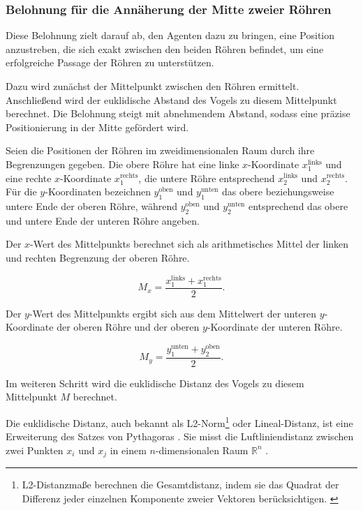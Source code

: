 \documentclass[conference]{IEEEtran}
\begin{document}
\subsubsection{Belohnung für die Annäherung der Mitte zweier Röhren}\label{reward_shaping_second}
Diese Belohnung zielt darauf ab, den Agenten dazu zu bringen, eine Position anzustreben, die sich exakt zwischen den beiden Röhren befindet, um eine erfolgreiche Passage der Röhren zu unterstützen.

Dazu wird zunächst der Mittelpunkt zwischen den Röhren ermittelt. Anschließend wird der euklidische Abstand des Vogels zu diesem Mittelpunkt berechnet. Die Belohnung steigt mit abnehmendem Abstand, sodass eine präzise Positionierung in der Mitte gefördert wird.

Seien die Positionen der Röhren im zweidimensionalen Raum durch ihre Begrenzungen gegeben. Die obere Röhre hat eine linke \(x\)-Koordinate \(x_1^{\text{links}}\) und eine rechte \(x\)-Koordinate \(x_1^{\text{rechts}}\), die untere Röhre entsprechend \(x_2^{\text{links}}\) und \(x_2^{\text{rechts}}\). Für die \(y\)-Koordinaten bezeichnen \(y_1^{\text{oben}}\) und \(y_1^{\text{unten}}\) das obere beziehungsweise untere Ende der oberen Röhre, während \(y_2^{\text{oben}}\) und \(y_2^{\text{unten}}\) entsprechend das obere und untere Ende der unteren Röhre angeben.

Der \(x\)-Wert des Mittelpunkts berechnet sich als arithmetisches Mittel der linken und rechten Begrenzung der oberen Röhre.

\begin{equation}
	M_x = \frac{x_1^{\text{links}} + x_1^{\text{rechts}}}{2}.
\end{equation}

Der \(y\)-Wert des Mittelpunkts ergibt sich aus dem Mittelwert der unteren \(y\)-Koordinate der oberen Röhre und der oberen \(y\)-Koordinate der unteren Röhre.

\begin{equation}
	M_y = \frac{y_1^{\text{unten}} + y_2^{\text{oben}}}{2}.
\end{equation}

Im weiteren Schritt wird die euklidische Distanz des Vogels zu diesem Mittelpunkt \(M\) berechnet. 

Die euklidische Distanz, auch bekannt als L2-Norm\footnote{L2-Distanzmaße berechnen die Gesamtdistanz, indem sie das Quadrat der Differenz jeder einzelnen Komponente zweier Vektoren berücksichtigen. \cite[S. 15]{prasath_distance_2019}} oder Lineal-Distanz, ist eine Erweiterung des Satzes von Pythagoras \cite[S. 10]{prasath_distance_2019}. Sie misst die Luftliniendistanz zwischen zwei Punkten \( x_i \) und \( x_j \) in einem \( n \)-dimensionalen Raum $\mathbb{R}^n$ \cite[S. 719]{madhulatha_overview_2012} \cite[S. 2]{mussabayev_optimizing_2024}.
\end{document}

